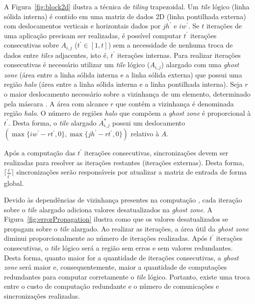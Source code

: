 A Figura~\ref{fig:block2d} ilustra a técnica de \textit{tiling} trapezoidal. Um
\textit{tile} lógico (linha sólida interna) é contido em uma matriz de dados 2D
(linha pontilhada externa) com deslocamentos verticais e horizontais dados
por $jh^\prime$ e $iw^\prime$. Se $t$ iterações de uma aplicação \stencil
precisam ser realizadas, é possível computar $t^\prime$ iterações consecutivas
sobre $A_{i,j}$ ($t^\prime \in \left[1,t\right]$) sem a necessidade de nenhuma
troca de dados entre \textit{tiles} adjacentes, isto é, $t^\prime$ iterações
internas. Para realizar iterações consecutivas é necessário utilizar um
\textit{tile} lógico ($A_{i,j}$) alargado com uma \textit{ghost zone} (área
entre a linha sólida interna e a linha sólida externa) que possui uma região
\textit{halo} (área entre a linha sólida interna e a linha pontilhada
interna). Seja $r$ o maior deslocamento necessário sobre a vizinhança de um
elemento, determinado pela máscara \stencil. A área com alcance $r$ que contém a
vizinhança é denominada região \textit{halo}. O número de regiões \textit{halo}
que compõem a \textit{ghost zone} é proporcional à $t^\prime$. Desta forma, o
\textit{tile} alargado $A^\ast_{i,j}$ possui um deslocamento $(\max\{iw^\prime -
rt^\prime, 0\}, \max\{jh^\prime - rt^\prime, 0\})$ relativo à $A$.

Após a computação das $t^\prime$ iterações consecutivas,
sincronizações devem ser realizadas para resolver as iterações restantes
(iterações externas). Desta forma, $\lceil\frac{t}{t^\prime}\rceil$
sincronizações serão responsáveis por atualizar a matriz de entrada de forma
global.

Devido às dependências de vizinhança presentes na computação \stencil, cada
iteração sobre o \textit{tile} alargado adiciona valores desatualizados na
\textit{ghost zone}. A Figura~\ref{fig:errorPropagation} ilustra como que os
valores desatualizados se propagam sobre o \textit{tile} alargado. Ao realizar as
iterações, a área útil da \textit{ghost zone} diminui proporcionalmente ao
número de iterações realizadas. Após $t^\prime$ iterações consecutivas, o
\textit{tile} lógico será a região sem erros e sem valores redundantes. Desta
forma, quanto maior for a quantidade de iterações consecutivas, a \textit{ghost
    zone} será maior e, consequentemente, maior a quantidade de computações
redundantes para computar corretamente o \textit{tile} lógico. Portanto, existe
uma troca entre o custo de computação redundante e o número de
comunicações e sincronizações realizadas.


